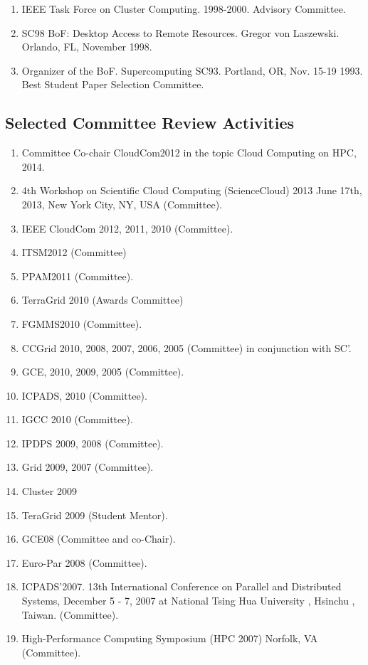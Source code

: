\documentclass{article}
\begin{document}
\begin{enumerate}
\item  IEEE Task Force on Cluster Computing. 1998-2000. Advisory Committee. 
\item  SC98 BoF: Desktop Access to Remote Resources.  Gregor von Laszewski. Orlando, FL, November 1998. 
\item  Organizer of the BoF. Supercomputing  SC93. Portland, OR, Nov. 15-19 1993. Best Student Paper Selection Committee. 
\end{enumerate}
 
\subsection{Selected Committee Review Activities}

\begin{enumerate}
\item  Committee Co-chair CloudCom2012 in the topic Cloud Computing on HPC, 2014.  
\item  4th Workshop on Scientific Cloud Computing (ScienceCloud) 2013 June 17th, 2013, New York City, NY, USA (Committee).
\item  IEEE CloudCom 2012, 2011, 2010 (Committee).
\item  ITSM2012 (Committee)
\item  PPAM2011 (Committee).
\item  TerraGrid 2010 (Awards Committee)
\item  FGMMS2010 (Committee).
\item  CCGrid 2010, 2008, 2007, 2006, 2005 (Committee) in conjunction with SC’.
\item  GCE, 2010, 2009, 2005 (Committee).
\item  ICPADS, 2010 (Committee).
\item  IGCC 2010 (Committee).
\item  IPDPS 2009, 2008 (Committee).
\item  Grid 2009, 2007 (Committee).
\item  Cluster 2009 
\item  TeraGrid 2009 (Student Mentor).
\item  GCE08 (Committee and co-Chair).
\item  Euro-Par 2008 (Committee).
\item  ICPADS'2007. 13th International Conference on Parallel and Distributed Systems, December 5 - 7, 2007 at National Tsing Hua University , Hsinchu , Taiwan. (Committee). 
\item High-Performance Computing Symposium (HPC 2007) Norfolk, VA (Committee). 

\end{enumerate}
\end{document}
